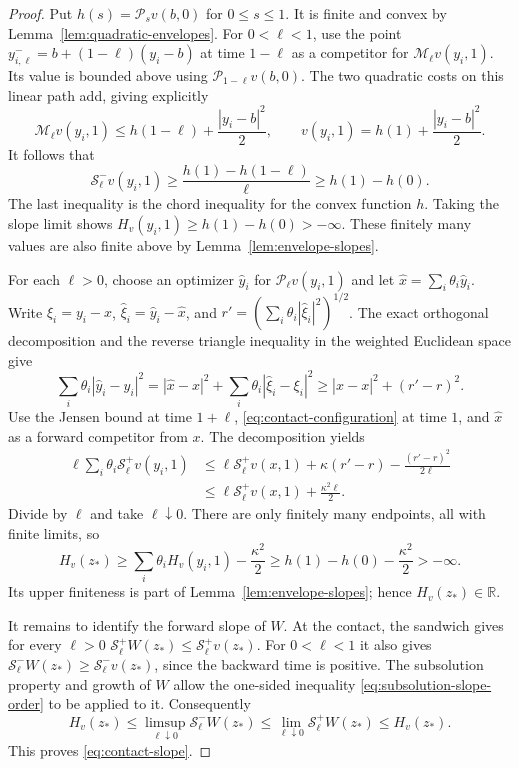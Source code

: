 \documentclass[11pt]{article}
\numberwithin{equation}{section}
\theoremstyle{definition}
\theoremstyle{remark}
\newcommand{\R}{\mathbb{R}}
\newcommand{\Penv}{\mathcal{P}}
\newcommand{\Menv}{\mathcal{M}}
\newcommand{\Senv}{\mathcal{S}}
\begin{document}
\begin{proof}
Put $h(s)=\Penv_s v(b,0)$ for $0\le s\le1$. It is finite and
convex by Lemma~\ref{lem:quadratic-envelopes}. For
$0<\ell<1$, use the point
$y_{i,\ell}^-=b+(1-\ell)(y_i-b)$ at time $1-\ell$ as a competitor for
$\Menv_\ell v(y_i,1)$. Its value is bounded above using
$\Penv_{1-\ell}v(b,0)$. The two quadratic costs on this linear
path add, giving explicitly
\[
  \Menv_\ell v(y_i,1)
      \le h(1-\ell)+\frac{|y_i-b|^2}{2},
  \qquad
  v(y_i,1)=h(1)+\frac{|y_i-b|^2}{2}.
\]
It follows that
\[
  \Senv_\ell^-v(y_i,1)
     \ge\frac{h(1)-h(1-\ell)}{\ell}
     \ge h(1)-h(0).
\]
The last inequality is the chord inequality for the convex
function $h$. Taking the slope limit shows
$H_v(y_i,1)\ge h(1)-h(0)>-\infty$. These finitely many values
are also finite above by Lemma~\ref{lem:envelope-slopes}.

For each $\ell>0$, choose an optimizer $\widehat y_i$ for
$\Penv_\ell v(y_i,1)$ and let
$\widehat x=\sum_i\theta_i\widehat y_i$. Write
$\xi_i=y_i-x$, $\widehat\xi_i=\widehat y_i-\widehat x$, and
$r'=(\sum_i\theta_i|\widehat\xi_i|^2)^{1/2}$. The exact
orthogonal decomposition and the reverse triangle inequality
in the weighted Euclidean space give
\[
  \sum_i\theta_i|\widehat y_i-y_i|^2
    =|\widehat x-x|^2+
        \sum_i\theta_i|\widehat\xi_i-\xi_i|^2
    \ge|\widehat x-x|^2+(r'-r)^2.
\]
Use the Jensen bound at time $1+\ell$,
\eqref{eq:contact-configuration} at time $1$, and
$\widehat x$ as a forward competitor from $x$. The
decomposition yields
\begin{align*}
  \ell\sum_i\theta_i\Senv_\ell^+v(y_i,1)
   &\le \ell\Senv_\ell^+v(x,1)
       +\kappa(r'-r)-\frac{(r'-r)^2}{2\ell}\\
   &\le \ell\Senv_\ell^+v(x,1)+\frac{\kappa^2\ell}{2}.
\end{align*}
Divide by $\ell$ and take $\ell\downarrow0$. There are only
finitely many endpoints, all with finite limits, so
\[
  H_v(z_*)\ge
     \sum_i\theta_i H_v(y_i,1)-\frac{\kappa^2}{2}
     \ge h(1)-h(0)-\frac{\kappa^2}{2}>-\infty.
\]
Its upper finiteness is part of
Lemma~\ref{lem:envelope-slopes}; hence $H_v(z_*)\in\R$.

It remains to identify the forward slope of $W$. At the
contact, the sandwich gives for every $\ell>0$
$\Senv_\ell^+W(z_*)\le\Senv_\ell^+v(z_*)$. For
$0<\ell<1$ it also gives
$\Senv_\ell^-W(z_*)\ge\Senv_\ell^-v(z_*)$, since the
backward time is positive. The subsolution property and growth
of $W$ allow the one-sided inequality
\eqref{eq:subsolution-slope-order} to be applied to it.
Consequently
\[
  H_v(z_*)\le
  \limsup_{\ell\downarrow0}\Senv_\ell^-W(z_*)
  \le\lim_{\ell\downarrow0}\Senv_\ell^+W(z_*)
  \le H_v(z_*).
\]
This proves \eqref{eq:contact-slope}.
\end{proof}
\end{document}
